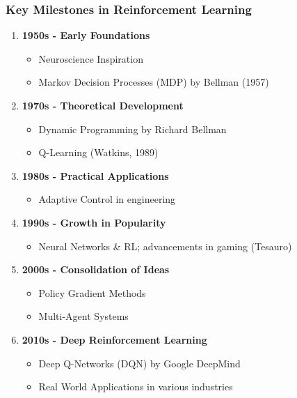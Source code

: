 \documentclass[aspectratio=169]{beamer}
\begin{document}
\begin{frame}[fragile]
    \frametitle{Key Milestones in Reinforcement Learning}
    \begin{enumerate}
        \item \textbf{1950s - Early Foundations}
            \begin{itemize}
                \item Neuroscience Inspiration
                \item Markov Decision Processes (MDP) by Bellman (1957)
            \end{itemize}
            
        \item \textbf{1970s - Theoretical Development}
            \begin{itemize}
                \item Dynamic Programming by Richard Bellman
                \item Q-Learning (Watkins, 1989)
            \end{itemize}
            
        \item \textbf{1980s - Practical Applications}
            \begin{itemize}
                \item Adaptive Control in engineering
            \end{itemize}
            
        \item \textbf{1990s - Growth in Popularity}
            \begin{itemize}
                \item Neural Networks & RL; advancements in gaming (Tesauro)
            \end{itemize}
            
        \item \textbf{2000s - Consolidation of Ideas}
            \begin{itemize}
                \item Policy Gradient Methods
                \item Multi-Agent Systems
            \end{itemize}
            
        \item \textbf{2010s - Deep Reinforcement Learning}
            \begin{itemize}
                \item Deep Q-Networks (DQN) by Google DeepMind
                \item Real World Applications in various industries
            \end{itemize}
    \end{enumerate}
\end{frame}
\end{document}
